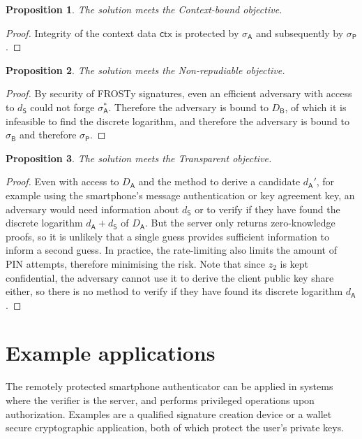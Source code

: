 \documentclass[a4paper]{article}
\newtheorem*{proposition}{Proposition}
\begin{document}
\begin{proposition}
The solution meets the Context-bound objective.
\end{proposition}

\begin{proof}
Integrity of the context data $\mathsf{ctx}$ is protected by $\sigma_\mathsf A$ and subsequently by $\sigma_\mathsf P$.
\end{proof}

\begin{proposition}
The solution meets the Non-repudiable objective.
\end{proposition}

\begin{proof}
By security of FROSTy signatures, even an efficient adversary with access to $d_\mathsf S$ could not forge $\sigma_\mathsf A^*$. Therefore the adversary is bound to $D_\mathsf B$, of which it is infeasible to find the discrete logarithm, and therefore the adversary is bound to $\sigma_\mathsf B$ and therefore $\sigma_\mathsf P$.
\end{proof}

\begin{proposition}
The solution meets the Transparent objective.
\end{proposition}

\begin{proof}
Even with access to $D_\mathsf A$ and the method to derive a candidate $d_\mathsf A'$, for example using the smartphone’s message authentication or key agreement key, an adversary would need information about $d_\mathsf S$ or to verify if they have found the discrete logarithm $d_\mathsf A+d_\mathsf S$ of $D_\mathsf A$. But the server only returns zero-knowledge proofs, so it is unlikely that a single guess provides sufficient information to inform a second guess. In practice, the rate-limiting also limits the amount of PIN attempts, therefore minimising the risk. Note that since $z_2$ is kept confidential, the adversary cannot use it to derive the client public key share either, so there is no method to verify if they have found its discrete logarithm $d_\mathsf A$.
\end{proof}

\section{Example applications}

The remotely protected smartphone authenticator can be applied in systems where the verifier is the server, and performs privileged operations upon authorization. Examples are a qualified signature creation device \cite{EN419241-1:2018} or a wallet secure cryptographic application, both of which protect the user’s private keys.
\end{document}
